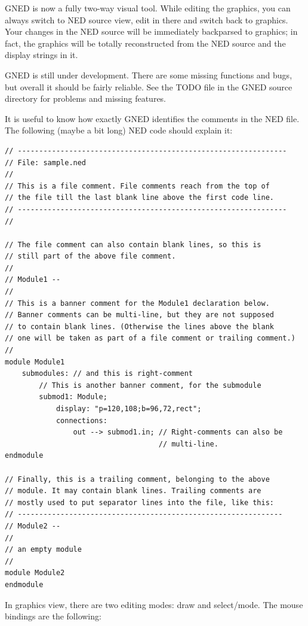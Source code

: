 GNED is now a fully two-way visual tool. While editing the graphics,
you can always switch to NED source view, edit in there and switch
back to graphics. Your changes in the NED source will be immediately
backparsed to graphics; in fact, the graphics will be totally
reconstructed from the NED source and the display strings in
it.

GNED is still under development. There are some missing functions
and bugs, but overall it should be fairly reliable. See the TODO
file in the GNED source directory for problems and missing features.




It is useful to know how exactly GNED identifies the comments
in the NED file. The following (maybe a bit long) NED code should
explain it:

\begin{verbatim}
// ---------------------------------------------------------------
// File: sample.ned
//
// This is a file comment. File comments reach from the top of
// the file till the last blank line above the first code line.
// ---------------------------------------------------------------
//

// The file comment can also contain blank lines, so this is
// still part of the above file comment.
//
// Module1 --
//
// This is a banner comment for the Module1 declaration below.
// Banner comments can be multi-line, but they are not supposed
// to contain blank lines. (Otherwise the lines above the blank
// one will be taken as part of a file comment or trailing comment.)
//
module Module1
    submodules: // and this is right-comment
        // This is another banner comment, for the submodule
        submod1: Module;
            display: "p=120,108;b=96,72,rect";
            connections:
                out --> submod1.in; // Right-comments can also be
                                    // multi-line.
endmodule

// Finally, this is a trailing comment, belonging to the above
// module. It may contain blank lines. Trailing comments are
// mostly used to put separator lines into the file, like this:
// --------------------------------------------------------------
// Module2 --
//
// an empty module
//
module Module2
endmodule
\end{verbatim}




In graphics view, there are two editing modes: draw and select/mode.
The mouse bindings are the following:


